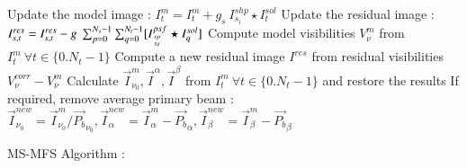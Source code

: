 \documentclass[structabstract]{stylefiles/aa}
\newcommand{\Pb}{{P_b}}
\begin{document}
\begin{algorithm}[Ht!]
{{{{      }
     }
       {
        Update the model image : $I^{m}_t = I^{m}_t + g_s ~ I^{shp}_{s_i} \star I^{sol}_t$ \;
	{
          Update the residual image : $I^{res}_{s,t} = I^{res}_{s,t} - g ~\sum_{p=0}^{N_s-1}\sum_{q=0}^{N_t-1}[I^{psf}_{{sp}\atop{tq}} \star I^{sol}_q]$\;
	}
       }
    }
   Compute model visibilities $V^{m}_{\nu}$ from  $I^{m}_t~\forall t\in \{0.N_t-1\}$\;
   Compute a new residual image $I^{res}$ from residual visibilities $V^{corr}_{\nu}-V^{m}_{\nu}$\;
  }
Calculate $\vec{I}^m_{\nu_0}, \vec{I}^{\alpha}, \vec{I}^{\beta}$ from $I^{m}_t~\forall t\in \{0.N_t-1\}$ and restore the results \;
If required, remove average primary beam : $\vec{I}^{new}_{\nu_0}=\vec{I}^m_{\nu_0}/\vec{\Pb}_{\nu_0}, \vec{I}^{new}_{\alpha}=\vec{I}^m_{\alpha}-\vec{\Pb}_{\alpha}, \vec{I}^{new}_{\beta}=\vec{I}^m_{\beta}-\vec{\Pb}_{\beta}$\;
\vspace{0.5cm}

  \caption[MS-MFS Algorithm]
          {MS-MFS Algorithm : }
\end{algorithm}

%
%
\end{document}
